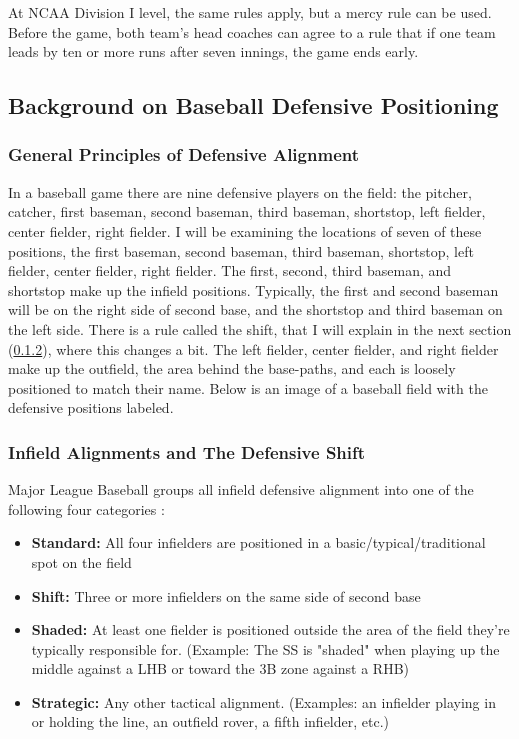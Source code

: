 \documentclass{article}
\begin{document}
At NCAA Division I level, the same rules apply, but a mercy rule can be used. Before the game, both team's head coaches can agree to a rule that if one team leads by ten or more runs after seven innings, the game ends early. \cite{ncaa2023baseballrules}



\subsection{Background on Baseball Defensive Positioning}
\subsubsection{General Principles of Defensive Alignment}
In a baseball game there are nine defensive players on the field: the pitcher, catcher, first baseman, second baseman, third baseman, shortstop, left fielder, center fielder, right fielder. I will be examining the locations of seven of these positions, the first baseman, second baseman, third baseman, shortstop, left fielder, center fielder, right fielder. The first, second, third baseman, and shortstop make up the infield positions. Typically, the first and second baseman will be on the right side of second base, and the shortstop and third baseman on the left side. There is a rule called the shift, that I will explain in the next section (\ref{sec:defensive_shifts}), where this changes a bit. The left fielder, center fielder, and right fielder make up the outfield, the area behind the base-paths, and each is loosely positioned to match their name. Below is an image of a baseball field with the defensive positions labeled. 


\subsubsection{Infield Alignments and The Defensive Shift} \label{sec:defensive_shifts}
Major League Baseball groups all infield defensive alignment into one of the following four categories \cite{mlb2023shifts}:

\begin{itemize}
    \item \textbf{Standard:} All four infielders are positioned in a basic/typical/traditional spot on the field
    \item \textbf{Shift:} Three or more infielders on the same side of second base
    \item \textbf{Shaded:} At least one fielder is positioned outside the area of the field they're typically responsible for. (Example: The SS is "shaded" when playing up the middle against a LHB or toward the 3B zone against a RHB)
    \item \textbf{Strategic:} Any other tactical alignment. (Examples: an infielder playing in or holding the line, an outfield rover, a fifth infielder, etc.)
\end{itemize}
\end{document}
